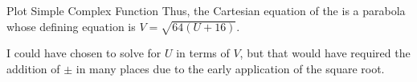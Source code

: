 \begin{example}[Lecture 4]{Plot Simple Complex Function}
  Thus, the Cartesian equation of the  is a parabola whose defining equation is $V = \sqrt{64 (U+16)}$.

  \begin{remark*}
    I could have chosen to solve for $U$ in terms of $V$, but that would have required the addition of $\pm$ in many places due to the early application of the square root.
  \end{remark*}
\end{example}



